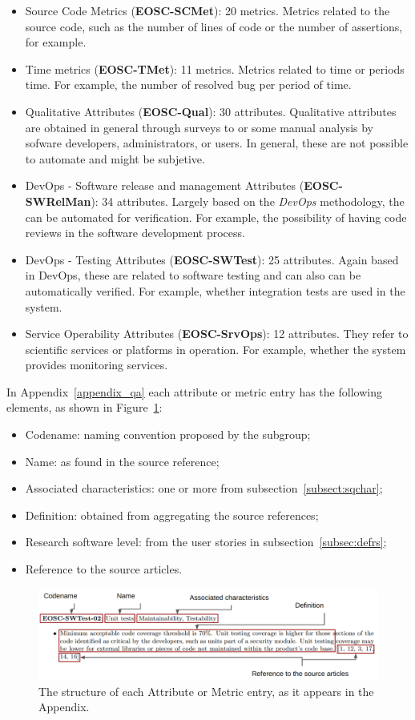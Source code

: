 \begin{itemize}
    \item Source Code Metrics (\textbf{EOSC-SCMet}): 20 metrics. Metrics related to the source code, such as the number of lines of code or the number of assertions, for example.

    \item Time metrics (\textbf{EOSC-TMet}): 11 metrics. Metrics related to time or periods time. For example, the number of resolved bug per period of time.

    \item Qualitative Attributes (\textbf{EOSC-Qual}): 30 attributes. Qualitative attributes are obtained in general through surveys to or some manual analysis by sofware developers, administrators, or users. In general, these are not possible to automate and might be subjetive.

    \item DevOps - Software release and management Attributes (\textbf{EOSC-SWRelMan}): 34 attributes. Largely based on the \textit{DevOps} methodology, the can be automated for verification. For example, the possibility of having code reviews in the software development process.

    \item DevOps - Testing Attributes (\textbf{EOSC-SWTest}): 25 attributes. Again based in DevOps, these are related to software testing and can also can be automatically verified. For example, whether integration tests are used in the system.

    \item Service Operability Attributes (\textbf{EOSC-SrvOps}): 12 attributes. They refer to scientific services or platforms in operation. For example, whether the system provides monitoring services.
\end{itemize}

In Appendix~\ref{appendix_qa} each attribute or metric entry has the following elements, as shown in Figure~\ref{fig:sqattr}:

\begin{itemize}
    \item Codename: naming convention proposed by the subgroup;
    \item Name: as found in the source reference;
    \item Associated characteristics: one or more from subsection~\ref{subsect:sqchar};
    \item Definition: obtained from aggregating the source references;
    \item Research software level: from the user stories in subsection~\ref{subsec:defrs};
    \item Reference to the source articles.
\end{itemize}

\begin{figure}[h]
    \centering
    \includegraphics[width=0.99\linewidth]{imgs/qa.png}
    \caption{The structure of each Attribute or Metric entry, as it appears in the Appendix.}
    \label{fig:sqattr}
\end{figure}
